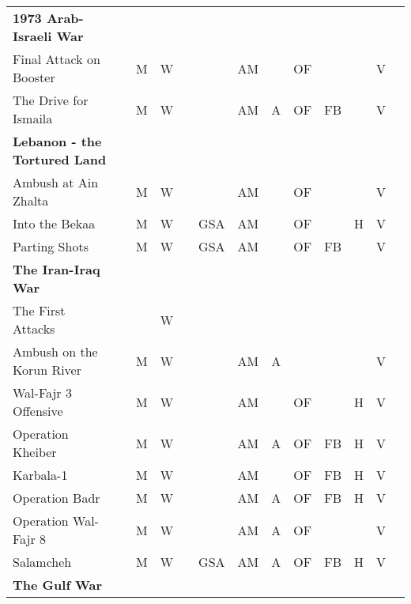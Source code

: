 \documentclass[a4paper]{article}
\newenvironment{texte}{\rmfamily\footnotesize}{}
\begin{document}
\begin{texte}
\begin{tabular}{lrrrrrrrrrrrr}
\bf 1973 Arab-Israeli War \\

     Final Attack on Booster                       &   &  M &  W &    &     & AM &   & OF &    &   &  V &   \\
     The Drive for Ismaila                         &   &  M &  W &    &     & AM & A & OF & FB &   &  V &   \\

\bf Lebanon - the Tortured Land \\

     Ambush at Ain Zhalta                          &   &  M &  W &    &     & AM &   & OF &    &   &  V &   \\
     Into the Bekaa                                &   &  M &  W &    & GSA & AM &   & OF &    & H &  V &   \\
     Parting Shots                                 &   &  M &  W &    & GSA & AM &   & OF & FB &   &  V &   \\

\bf The Iran-Iraq War \\

     The First Attacks                             &   &    &  W &    &     &    &   &    &    &   &    &   \\
     Ambush on the Korun River                     &   &  M &  W &    &     & AM & A &    &    &   &  V &   \\
     Wal-Fajr 3 Offensive                          &   &  M &  W &    &     & AM &   & OF &    & H &  V &   \\
     Operation Kheiber                             &   &  M &  W &    &     & AM & A & OF & FB & H &  V &   \\
     Karbala-1                                     &   &  M &  W &    &     & AM &   & OF & FB & H &  V &   \\
     Operation Badr                                &   &  M &  W &    &     & AM & A & OF & FB & H &  V &   \\
     Operation Wal-Fajr 8                          &   &  M &  W &    &     & AM & A & OF &    &   &  V &   \\
     Salamcheh                                     &   &  M &  W &    & GSA & AM & A & OF & FB & H &  V &   \\

\bf The Gulf War \\


\end{tabular}
\end{texte}
\end{document}
